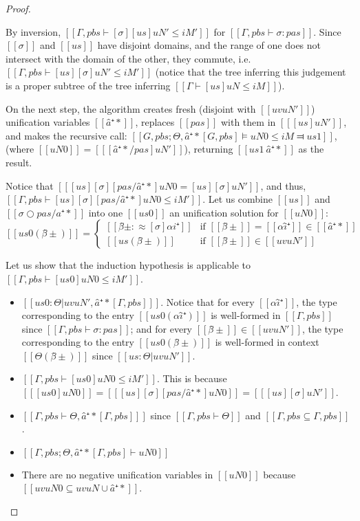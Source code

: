\begin{proof}
\begin{caseof}
       By inversion, 
       $[[ Γ, pbs ⊢ [σ][us]uN' ≤ iM' ]]$ for 
       $[[Γ, pbs ⊢ σ : pas ]]$.
       Since $[[σ]]$ and $[[us]]$ have disjoint domains,
       and the range of one does not intersect with the domain of the other,
       they commute, i.e. $[[ Γ, pbs ⊢ [us][σ]uN' ≤ iM' ]]$
       (notice that the tree inferring this judgement is 
       a proper subtree of the tree inferring 
       $[[ Γ ⊢ [us]uN ≤ iM ]]$).

       On the next step, 
       the algorithm creates fresh (disjoint with $[[uv uN']]$) 
       unification variables $[[â⁺*]]$, replaces $[[pas]]$ with them in $[[ [us]uN' ]]$,
       and makes the recursive call:
       $[[G, pbs; Θ, â⁺*[G, pbs] ⊨ uN0 ≤ iM ⫤ us1]]$,
       (where $[[uN0]] = [[ [â⁺*/pas]uN' ]]$),
       returning $[[us1 \ {â⁺*}]]$ as the result.

       Notice that $[[ [us][σ][pas/â⁺*]uN0 = [us][σ]uN' ]]$,
       and thus, $[[ Γ, pbs ⊢ [us][σ][pas/â⁺*]uN0 ≤ iM' ]]$.
       Let us combine $[[us]]$ and $[[σ  ○ pas/â⁺*]]$ into one 
       $[[us0]]$ an unification solution for $[[uN0]]$:
        \[
            [[us0(β̂±)]]  = 
            \begin{cases}
               [[ β̂± :≈ [σ]αi⁺ ]] & \text{if } [[β̂±]] = [[αî⁺]] \in [[â⁺*]] \\
               [[us(β̂±)]] & \text{if } [[β̂±]] \in [[uv uN']]
            \end{cases}
       \]

       Let us show that the induction hypothesis is applicable to 
       $[[Γ, pbs ⊢ [us0]uN0 ≤ iM' ]]$.
       \begin{itemize}
        \item $[[ us0 : Θ|uv uN', â⁺*[Γ, pbs] ]]$. Notice that for every $[[αî⁺]]$, 
            the type corresponding to the entry $[[us0(αî⁺)]]$ 
            is well-formed in $[[Γ, pbs]]$ since $[[Γ, pbs ⊢ σ : pas ]]$;
            and for every $[[β̂±]] \in [[uv uN']]$, 
            the type corresponding to the entry $[[us0(β̂±)]]$ is well-formed in
            context $[[Θ(β̂±)]]$ since $[[us : Θ | uv uN']]$.
        \item $[[Γ, pbs ⊢ [us0]uN0 ≤ iM' ]]$. This is because
            $[[ [us0]uN0 ]] = [[ [us][σ][pas/â⁺*]uN0 ]] = [[ [us][σ]uN' ]]$.
        \item $[[ Γ, pbs ⊢ Θ, â⁺*[Γ, pbs] ]]$ since
            $[[Γ, pbs ⊢ Θ]]$ and $[[ {Γ, pbs} ⊆ {Γ, pbs} ]]$.
        \item $[[Γ, pbs ; Θ, â⁺*[Γ, pbs] ⊢ uN0 ]]$
        \item There are no negative unification variables in $[[uN0]]$ because
            $[[ uv uN0 ⊆ uv uN ∪ {â⁺*} ]]$.
       \end{itemize}


\end{caseof}
\end{proof}
